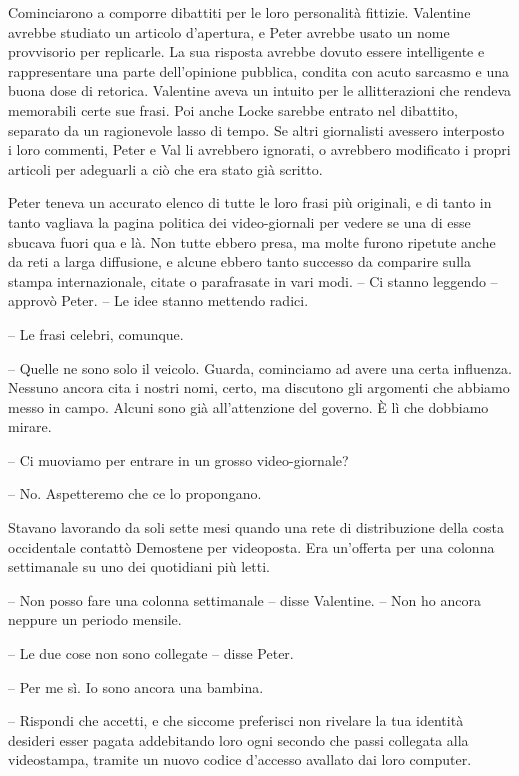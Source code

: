 {Cominciarono a comporre dibattiti per le loro personalità fittizie.
	Valentine avrebbe studiato un articolo d'apertura, e Peter avrebbe usato
	un nome provvisorio per replicarle. La sua risposta avrebbe dovuto
	essere intelligente e rappresentare una parte dell'opinione pubblica,
	condita con acuto sarcasmo e una buona dose di retorica. Valentine aveva
	un intuito per le allitterazioni che rendeva memorabili certe sue frasi.
	Poi anche Locke sarebbe entrato nel dibattito, separato da un
	ragionevole lasso di tempo. Se altri giornalisti avessero interposto i
	loro commenti, Peter e Val li avrebbero ignorati, o avrebbero modificato
	i propri articoli per adeguarli a ciò che era stato già scritto.}

{Peter teneva un accurato elenco di tutte le loro frasi più originali, e
	di tanto in tanto vagliava la pagina politica dei video-giornali per
	vedere se una di esse sbucava fuori qua e là. Non tutte ebbero presa, ma
	molte furono ripetute anche da reti a larga diffusione, e alcune ebbero
	tanto successo da comparire sulla stampa internazionale, citate o
	parafrasate in vari modi. -- Ci stanno leggendo -- approvò Peter. -- Le
	idee stanno mettendo radici.}

{-- Le frasi celebri, comunque.}

{-- Quelle ne sono solo il veicolo. Guarda, cominciamo ad avere una
	certa influenza. Nessuno ancora cita i nostri nomi, certo, ma discutono
	gli argomenti che abbiamo messo in campo. Alcuni sono già all'attenzione
	del governo. È lì che dobbiamo mirare.}

{-- Ci muoviamo per entrare in un grosso video-giornale?}

{-- No. Aspetteremo che ce lo propongano.}

{Stavano lavorando da soli sette mesi quando una rete di distribuzione
	della costa occidentale contattò Demostene per videoposta. Era
	un'offerta per una colonna settimanale su uno dei quotidiani più letti.}

{-- Non posso fare una colonna settimanale -- disse Valentine. -- Non ho
	ancora neppure un periodo mensile.}

{-- Le due cose non sono collegate -- disse Peter.}

{-- Per me sì. Io sono ancora una bambina.}

{-- Rispondi che accetti, e che siccome preferisci non rivelare la tua
	identità desideri esser pagata addebitando loro ogni secondo che passi
	collegata alla videostampa, tramite un nuovo codice d'accesso avallato
	dai loro computer.}

